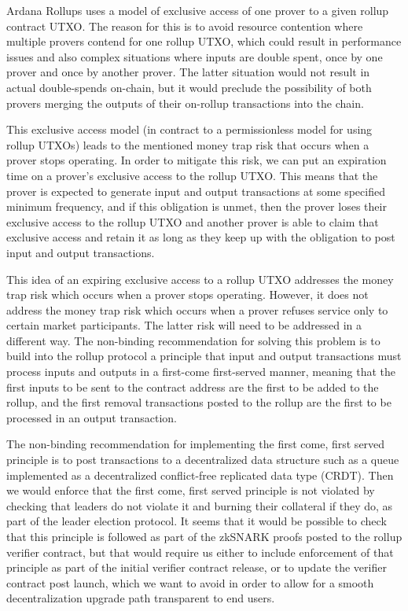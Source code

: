 \documentclass[12pt]{article}
\begin{document}
Ardana Rollups uses a model of exclusive access of one prover to a given rollup contract UTXO. The reason for this is to avoid resource contention where multiple provers contend for one rollup UTXO, which could result in performance issues and also complex situations where inputs are double spent, once by one prover and once by another prover. The latter situation would not result in actual double-spends on-chain, but it would preclude the possibility of both provers merging the outputs of their on-rollup transactions into the chain.

This exclusive access model (in contract to a permissionless model for using rollup UTXOs) leads to the mentioned money trap risk that occurs when a prover stops operating. In order to mitigate this risk, we can put an expiration time on a prover's exclusive access to the rollup UTXO. This means that the prover is expected to generate input and output transactions at some specified minimum frequency, and if this obligation is unmet, then the prover loses their exclusive access to the rollup UTXO and another prover is able to claim that exclusive access and retain it as long as they keep up with the obligation to post input and output transactions.

This idea of an expiring exclusive access to a rollup UTXO addresses the money trap risk which occurs when a prover stops operating. However, it does not address the money trap risk which occurs when a prover refuses service only to certain market participants. The latter risk will need to be addressed in a different way. The non-binding recommendation for solving this problem is to build into the rollup protocol a principle that input and output transactions must process inputs and outputs in a first-come first-served manner, meaning that the first inputs to be sent to the contract address are the first to be added to the rollup, and the first removal transactions posted to the rollup are the first to be processed in an output transaction.

The non-binding recommendation for implementing the first come, first served principle is to post transactions to a decentralized data structure such as a queue implemented as a decentralized conflict-free replicated data type (CRDT). Then we would enforce that the first come, first served principle is not violated by checking that leaders do not violate it and burning their collateral if they do, as part of the leader election protocol. It seems that it would be possible to check that this principle is followed as part of the zkSNARK proofs posted to the rollup verifier contract, but that would require us either to include enforcement of that principle as part of the initial verifier contract release, or to update the verifier contract post launch, which we want to avoid in order to allow for a smooth decentralization upgrade path transparent to end users.
\end{document}
